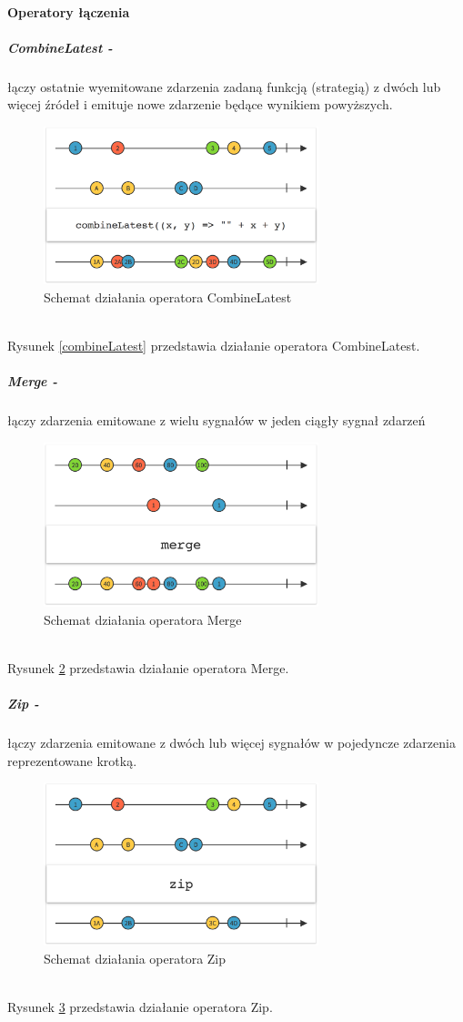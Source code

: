 \documentclass[12pt,oneside,a4paper]{report}
\begin{document}
\paragraph{Operatory łączenia}
\subparagraph{CombineLatest -}łączy ostatnie wyemitowane zdarzenia zadaną funkcją (strategią) z dwóch lub więcej źródeł i emituje nowe zdarzenie będące wynikiem powyższych. 
\begin{figure}[ht!]
	\centering
	\includegraphics[width=8cm]{combinelatest}
	\caption{Schemat działania operatora CombineLatest\cite{marbles}}
	\label{combinelatest}
\end{figure}\\
Rysunek \ref{combineLatest} przedstawia działanie operatora CombineLatest.
\subparagraph{Merge -}łączy zdarzenia emitowane z wielu sygnałów w jeden ciągły sygnał zdarzeń
\begin{figure}[ht!]
	\centering
	\includegraphics[width=8cm]{merge}
	\caption{Schemat działania operatora Merge\cite{marbles}}
	\label{merge}
\end{figure}\\
Rysunek \ref{merge} przedstawia działanie operatora Merge.
\subparagraph{Zip -}łączy zdarzenia emitowane z dwóch lub więcej sygnałów w pojedyncze zdarzenia reprezentowane krotką. 
\begin{figure}[ht!]
	\centering
	\includegraphics[width=8cm]{zip}
	\caption{Schemat działania operatora Zip\cite{zip}}
	\label{zip}
\end{figure}\\
Rysunek \ref{zip} przedstawia działanie operatora Zip.
\end{document}
